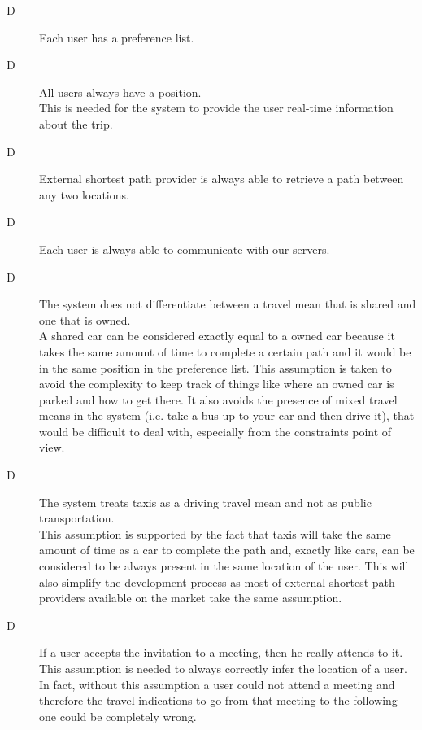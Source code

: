 \begin{description}
\item[D\thecountDom]  Each user has a preference list.

\item[D\thecountDom]  All users always have a position. \\ [0.1cm]
This is needed for the system to provide the user real-time information about the trip.

\item[D\thecountDom]  External shortest path provider is always able to retrieve a path between any two locations.

\item[D\thecountDom] Each user is always able to communicate with our servers.

\item[D\thecountDom] The system does not differentiate between a travel mean that is shared and one that is owned. \\ [0.1cm]
A shared car can be considered exactly equal to a owned car because it takes the same amount of time to complete a certain path and it would be in the same position in the preference list. This assumption is taken to avoid the complexity to keep track of things like where an owned car is parked and how to get there. It also avoids the presence of mixed travel means in the system (i.e. take a bus up to your car and then drive it), that would be difficult to deal with, especially from the constraints point of view.
\normalsize

\item[D\thecountDom] The system treats taxis as a driving travel mean and not as public transportation. \\ [0.1cm]
This assumption is supported by the fact that taxis will take the same amount of time as a car to complete the path and, exactly like cars, can be considered to be always present in the same location of the user. This will also simplify the development process as most of external shortest path providers available on the market take the same assumption.

\item[D\thecountDom] If a user accepts the invitation to a meeting, then he really attends to it.  \\ [0.1cm]
This assumption is needed to always correctly infer the location of a user. In fact, without this assumption a user could not attend a meeting and therefore the travel indications to go from that meeting to the following one could be completely wrong.
\end{description}